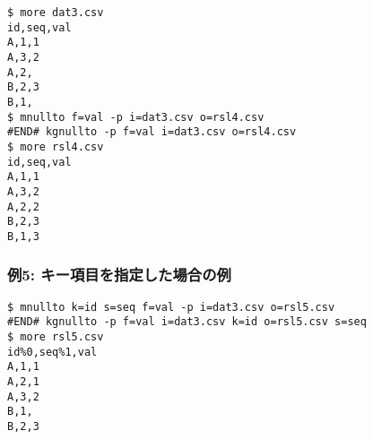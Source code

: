 \begin{Verbatim}[baselinestretch=0.7,frame=single]
$ more dat3.csv
id,seq,val
A,1,1
A,3,2
A,2,
B,2,3
B,1,
$ mnullto f=val -p i=dat3.csv o=rsl4.csv
#END# kgnullto -p f=val i=dat3.csv o=rsl4.csv
$ more rsl4.csv
id,seq,val
A,1,1
A,3,2
A,2,2
B,2,3
B,1,3
\end{Verbatim}
\subsubsection*{例5: キー項目を指定した場合の例}



\begin{Verbatim}[baselinestretch=0.7,frame=single]
$ mnullto k=id s=seq f=val -p i=dat3.csv o=rsl5.csv
#END# kgnullto -p f=val i=dat3.csv k=id o=rsl5.csv s=seq
$ more rsl5.csv
id%0,seq%1,val
A,1,1
A,2,1
A,3,2
B,1,
B,2,3
\end{Verbatim}
